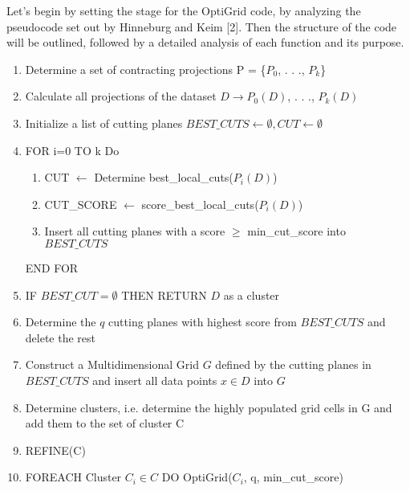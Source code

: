 Let's begin by setting the stage for the OptiGrid code, by analyzing the pseudocode set out by Hinneburg and Keim [2]. Then the structure of the code will be outlined, followed by a detailed analysis of each function and its purpose.\newline
\begin{tcolorbox}[breakable, title={$OptiGrid(dataset~D,~q,~min\_cut\_score)$}]
    \footnotesize     
    
    \begin{enumerate}[label=\arabic*., leftmargin=0.2cm]
        \item Determine a set of contracting projections P = \{$P_0$, . . ., $P_k$\}
        \item Calculate all projections of the dataset $D \to P_{0}(D)$, . . ., $P_{k}(D)$
        \item Initialize a list of cutting planes $BEST\_CUTS \leftarrow \emptyset, CUT \leftarrow \emptyset$
        \item FOR i=0 TO k Do
        \begin{enumerate}[label=\alph*., leftmargin=0.2cm]
            \item CUT $\leftarrow$ Determine best\_local\_cuts($P_i(D)$)
            \item CUT\_SCORE $\leftarrow$ score\_best\_local\_cuts($P_i(D)$)
            \item Insert all cutting planes with a score $\geq$ min\_cut\_score into $BEST\_CUTS$            
        \end{enumerate}
        END FOR
        \item IF $BEST\_CUT = \emptyset$ THEN RETURN $D$ as a cluster
        \item Determine the $q$ cutting planes with highest score from $BEST\_CUTS$ and delete the rest
        \item Construct a Multidimensional Grid $G$ defined by the cutting planes in $BEST\_CUTS$ and insert all data points $x \in D$ into $G$
        \item Determine clusters, i.e. determine the highly populated grid cells in G and add them to the set of cluster C
        \item REFINE(C)
        \item FOREACH Cluster $C_i \in C$ DO\newline
        OptiGrid($C_i$, q, min\_cut\_score)
    \end{enumerate}    
\end{tcolorbox}
\normalsize

